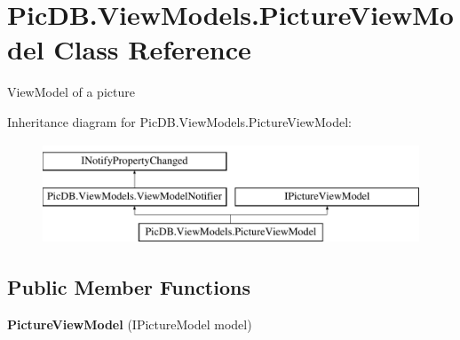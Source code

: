 \hypertarget{class_pic_d_b_1_1_view_models_1_1_picture_view_model}{}\section{Pic\+D\+B.\+View\+Models.\+Picture\+View\+Model Class Reference}
\label{class_pic_d_b_1_1_view_models_1_1_picture_view_model}


View\+Model of a picture  


Inheritance diagram for Pic\+D\+B.\+View\+Models.\+Picture\+View\+Model\+:\begin{figure}[H]
\begin{center}
\leavevmode
\includegraphics[height=3.000000cm]{class_pic_d_b_1_1_view_models_1_1_picture_view_model}
\end{center}
\end{figure}
\subsection*{Public Member Functions}
\begin{DoxyCompactItemize}
\item 
\mbox{\label{class_pic_d_b_1_1_view_models_1_1_picture_view_model_a7b7e420f9cf6ffdb0700be4e117d47dd}} 
{\bfseries Picture\+View\+Model} (I\+Picture\+Model model)
\end{DoxyCompactItemize}
